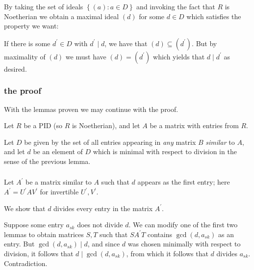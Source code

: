 \documentclass{beamer}
\newcommand{\cbr}[1]{\left\{#1\right\}}
\begin{document}
\begin{frame}
  \frametitle{}

  By taking the set of ideals $\cbr{(a)\colon a\in D}$ and invoking the fact that $R$ is Noetherian we obtain a maximal ideal $(d)$ for some $d\in D$ which satisfies the property we want:
  
  If there is some $d^{\prime}\in D$ with $d^{\prime}\mid d$, we have that $(d)\subseteq (d^{\prime})$. But by maximality of $(d)$ we must have $(d)= (d^{\prime})$ which yields that $d\mid d^{\prime}$ as desired.

\end{frame}

\begin{frame}
  \frametitle{the proof}

  With the lemmas proven we may continue with the proof.

  Let $R$ be a PID (so $R$ is Noetherian), and let $A$ be a matrix with entries from $R$. 

  Let $D$ be given by the set of all entries appearing in \textit{any} matrix $B$ \textit{similar} to $A$, and let $d$ be an element of $D$ which is minimal with respect to division in the sense of the previous lemma.

\end{frame}

\begin{frame}
  \frametitle{}

  Let $A^{\prime}$ be a matrix similar to $A$ such that $d$ appears as the first entry; here $A^{\prime} = U^{\prime}AV^{\prime}$ for invertible $U^{\prime},V^{\prime}$.
  
  We show that $d$ divides every entry in the matrix $A^{\prime}$.

  Suppose some entry $a_{sk}$ does not divide $d$. We can modify one of the first two lemmas to obtain matrices $S,T$ such that $SA^{\prime}T$ contains $\gcd(d,a_{sk})$ as an entry. But $\gcd(d,a_{sk})\mid d$, and since $d$ was chosen minimally with respect to division, it follows that $d\mid \gcd(d,a_{sk})$, from which it follows that $d$ divides $a_{sk}$. Contradiction.

\end{frame}
\end{document}
